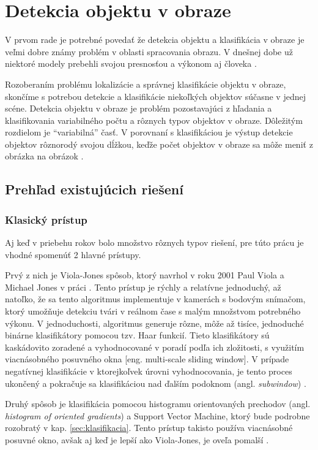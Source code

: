 
\section{Detekcia objektu v obraze}
\label{sec:detekcia}

V prvom rade je potrebné povedať že detekcia objektu a klasifikácia v obraze je veľmi dobre známy problém v oblasti spracovania obrazu.
V dnešnej dobe už niektoré modely prebehli svojou presnosťou a výkonom aj človeka \cite{prop:NNvsHuman}.

Rozoberaním problému lokalizácie a správnej klasifikácie objektu v obraze, skončíme s potrebou
    detekcie a klasifikácie niekoľkých objektov súčasne v jednej scéne.
Detekcia objektu v obraze je problém pozostavajúci z hľadania a klasifikovania variabilného počtu a rôznych typov objektov v obraze.
Dôležitým rozdielom je ``variabilná'' časť. V porovnaní s klasifikáciou je výstup detekcie objektov rôznorodý svojou dĺžkou, keďže
    počet objektov v obraze sa môže meniť z obrázka na obrázok \cite{odkaz:ObjectDetectionOverview}.

\subsection{Prehľad existujúcich riešení}

\subsubsection{Klasický prístup}
Aj keď v priebehu rokov bolo množstvo rôznych typov riešení, pre túto prácu je vhodné spomenúť 2 hlavné prístupy.

Prvý z nich je Viola-Jones spôsob, ktorý navrhol v roku 2001 Paul Viola a Michael Jones v práci \cite{prop:Viola2001RobustRF}.
Tento prístup je rýchly a relatívne jednoduchý, až natoľko, že sa tento algoritmus implementuje v kamerách s bodovým snímačom, ktorý umožňuje
    detekciu tvári v reálnom čase s malým množstvom potrebného výkonu.
V jednoduchosti, algoritmus generuje rôzne, môže až tisíce, jednoduché binárne klasifikátory pomocou tzv. Haar funkcií.
Tieto klasifikátory sú kaskádovito zoradené a vyhodnocované v poradí podľa ich zložitosti, s využitím viacnásobného posuvného okna [eng. multi-scale sliding window].
V prípade negatívnej klasifikácie v ktorejkoľvek úrovni vyhodnocovania, je tento proces ukončený a pokračuje sa klasifikáciou nad ďalším podoknom (angl. \textit{subwindow}) \cite{prop:Viola2001RobustRF}.

Druhý spôsob je klasifikácia pomocou histogramu orientovaných prechodov (angl. \textit{histogram of oriented gradients}) a Support Vector Machine, ktorý bude podrobne
    rozobratý v kap. \ref{sec:klasifikacia}. Tento prístup takisto používa viacnásobné posuvné okno, avšak aj keď je lepší ako Viola-Jones, je oveľa pomalší \cite{odkaz:ObjectDetectionOverview}.

